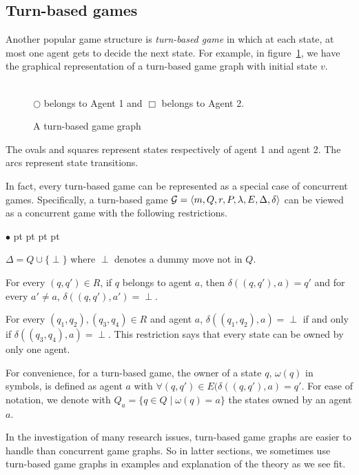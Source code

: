 \documentclass[11pt]{article}
\newcommand{\calg}{{\cal G}}
\newcommand{\pfrr}{\Box}
\newenvironment{list1}{\begin{list}{$\bullet$}
{\topsep 0 pt \parsep 0 pt \partopsep 0 pt \itemsep 0 pt}}{\end{list}}
\begin{document}
\subsection{Turn-based games \label{subsec.gg.tb}} 

Another popular game structure is {\em turn-based game} 
in which at each state, at most one agent gets to decide the next state. 
For example, in figure~\ref{fig.tg}, we have the graphical representation of 
a turn-based game graph with initial state $v$.  
\begin{figure}[!ht]
\begin{center}
 \\
$\bigcirc$ belongs to Agent 1 and $\pfrr$ belongs to Agent 2.
\end{center}
\caption{A turn-based game graph}
\label{fig.tg}
\end{figure} 
The ovals and squares represent states respectively of 
agent 1 and agent 2. 
The arcs represent state transitions.  

In fact, every turn-based game can be represented as a special case of 
concurrent games.  
Specifically, a turn-based game 
$\calg=\langle m,Q,r,P,\lambda,E,\Delta,\delta\rangle$ 
can be viewed as a concurrent game with the following restrictions. 
\begin{list1} 
\item $\Delta=Q\cup\{\perp\}$ where $\perp$ denotes a dummy move not in $Q$. 
\item For every $(q,q')\in R$, if $q$ belongs to agent $a$, 
	then $\delta((q,q'),a)=q'$ and 
	for every $a'\neq a$, $\delta((q,q'),a')=\perp$. 
\item For every $(q_1,q_2),(q_3,q_4)\in R$ and agent $a$, 
	$\delta((q_1,q_2),a)=\perp$ if and only if $\delta((q_3,q_4),a)=\perp$.  
	This restriction says that every state can be owned by only one agent. 
\end{list1} 
For convenience, for a turn-based game, 
the owner of a state $q$, $\omega(q)$ in symbols, is defined as agent $a$ with 
$\forall (q,q')\in E(\delta((q,q'),a)=q'$.  
For ease of notation, we denote with 
$Q_a = \{q \in Q \mid \omega(q)=a\}$ 
the states owned by an agent $a$.

In the investigation of many research issues, 
turn-based game graphs are easier to handle than concurrent game graphs.   
So in latter sections, we sometimes use turn-based game graphs 
in examples and explanation of the theory as we see fit. 
\end{document}

